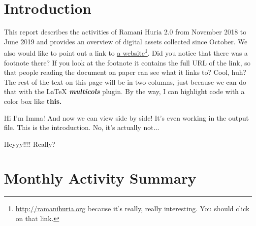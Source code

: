\documentclass[a4paper,12pt,twoside]{article}
\begin{document}

\newpage
\section{Introduction}
\label{Introduction}

This report describes the activities of Ramani Huria 2.0 from November 2018 to June 2019 and provides an overview of digital assets collected since October.
\bigskip
We also would like to point out a link to  \href{https://ramanihuria.org}{a website}\footnote{\url{http://ramanihuria.org}\color{RHgrey} { }because it's really, really interesting. You should click on that link.}. Did you notice that there was a footnote there? If you look at the footnote it contains the full URL of the link, so that people reading the document on paper can see what it links to? Cool, huh? The rest of the text on this page will be in two columns, just because we can do that with the \LaTeX{} \textbf{\textit{multicols}} plugin. By the way, I can highlight code with a color box like \textbf{\colorbox{code}{this.}}

Hi I'm Imma! And now we can view side by side! It's even working in the output file. This is the introduction. No, it's actually not...

Heyyy!!!! Really?

\newpage
\section{Monthly Activity Summary}
\end{document}
